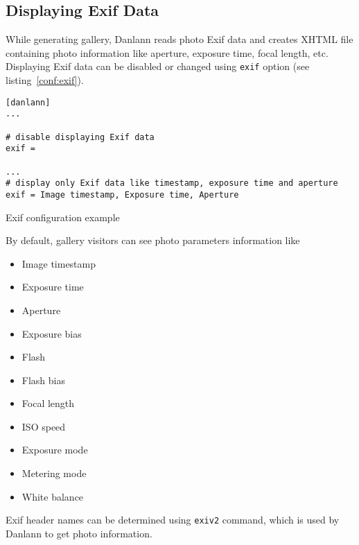 \documentclass{article}
\begin{document}
\subsection{Displaying Exif Data}\label{exif}
While generating gallery, Danlann reads photo Exif data and creates
XHTML file containing photo information like aperture,
exposure time, focal length, etc. Displaying Exif data can be disabled
or changed using \texttt{exif} option (see listing~\ref{conf:exif}).

\begin{listing}
\begin{lstlisting}
[danlann]
...

# disable displaying Exif data
exif =

...
# display only Exif data like timestamp, exposure time and aperture
exif = Image timestamp, Exposure time, Aperture
\end{lstlisting}
\caption{Exif configuration example}\label{conf:exif}
\end{listing}

By default, gallery visitors can see photo parameters information like

\begin{multicols}{3}
\begin{itemize}
\item Image timestamp
\item Exposure time
\item Aperture
\item Exposure bias
\item Flash
\item Flash bias
\item Focal length
\item ISO speed
\item Exposure mode
\item Metering mode
\item White balance
\end{itemize}
\end{multicols}

Exif header names can be determined using \texttt{exiv2} command, which is
used by Danlann to get photo information.

\end{document}
